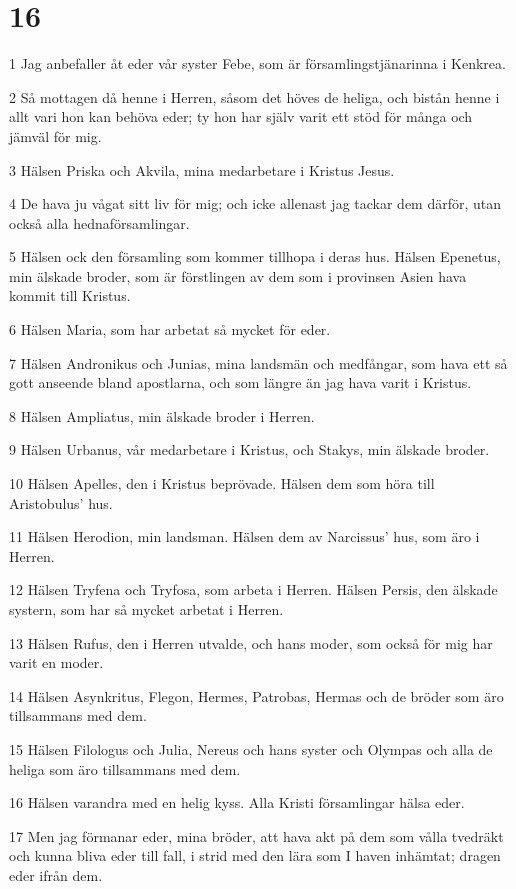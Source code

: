 \chapter{16}

\par 1 Jag anbefaller åt eder vår syster Febe, som är församlingstjänarinna i Kenkrea.
\par 2 Så mottagen då henne i Herren, såsom det höves de heliga, och bistån henne i allt vari hon kan behöva eder; ty hon har själv varit ett stöd för många och jämväl för mig.
\par 3 Hälsen Priska och Akvila, mina medarbetare i Kristus Jesus.
\par 4 De hava ju vågat sitt liv för mig; och icke allenast jag tackar dem därför, utan också alla hednaförsamlingar.
\par 5 Hälsen ock den församling som kommer tillhopa i deras hus. Hälsen Epenetus, min älskade broder, som är förstlingen av dem som i provinsen Asien hava kommit till Kristus.
\par 6 Hälsen Maria, som har arbetat så mycket för eder.
\par 7 Hälsen Andronikus och Junias, mina landsmän och medfångar, som hava ett så gott anseende bland apostlarna, och som längre än jag hava varit i Kristus.
\par 8 Hälsen Ampliatus, min älskade broder i Herren.
\par 9 Hälsen Urbanus, vår medarbetare i Kristus, och Stakys, min älskade broder.
\par 10 Hälsen Apelles, den i Kristus beprövade. Hälsen dem som höra till Aristobulus' hus.
\par 11 Hälsen Herodion, min landsman. Hälsen dem av Narcissus' hus, som äro i Herren.
\par 12 Hälsen Tryfena och Tryfosa, som arbeta i Herren. Hälsen Persis, den älskade systern, som har så mycket arbetat i Herren.
\par 13 Hälsen Rufus, den i Herren utvalde, och hans moder, som också för mig har varit en moder.
\par 14 Hälsen Asynkritus, Flegon, Hermes, Patrobas, Hermas och de bröder som äro tillsammans med dem.
\par 15 Hälsen Filologus och Julia, Nereus och hans syster och Olympas och alla de heliga som äro tillsammans med dem.
\par 16 Hälsen varandra med en helig kyss. Alla Kristi församlingar hälsa eder.
\par 17 Men jag förmanar eder, mina bröder, att hava akt på dem som vålla tvedräkt och kunna bliva eder till fall, i strid med den lära som I haven inhämtat; dragen eder ifrån dem.
